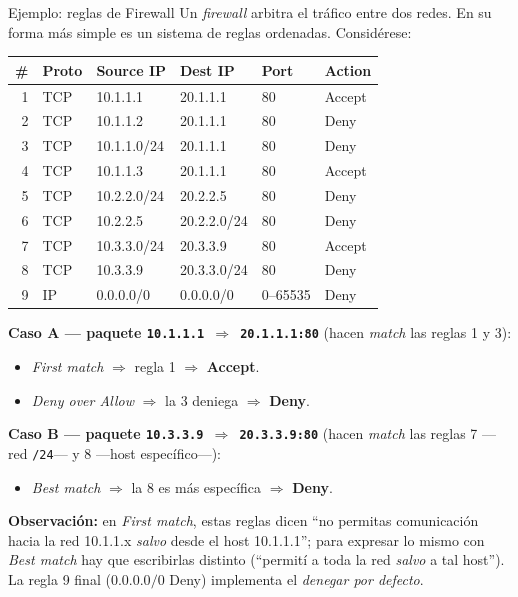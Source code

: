 \documentclass[11pt,a4paper]{article}
\begin{document}
\begin{practbox}{Ejemplo: reglas de Firewall}
Un \emph{firewall} arbitra el tráfico entre dos redes. En su forma más simple es un sistema
de reglas ordenadas. Considérese:
\begin{center}
\ttfamily\footnotesize
\renewcommand{\arraystretch}{1.1}
\begin{tabular}{r l l l l l}
\toprule
\# & Proto & Source IP & Dest IP & Port & Action\\
\midrule
1 & TCP & 10.1.1.1 & 20.1.1.1 & 80 & Accept\\
2 & TCP & 10.1.1.2 & 20.1.1.1 & 80 & Deny\\
3 & TCP & 10.1.1.0/24 & 20.1.1.1 & 80 & Deny\\
4 & TCP & 10.1.1.3 & 20.1.1.1 & 80 & Accept\\
5 & TCP & 10.2.2.0/24 & 20.2.2.5 & 80 & Deny\\
6 & TCP & 10.2.2.5 & 20.2.2.0/24 & 80 & Deny\\
7 & TCP & 10.3.3.0/24 & 20.3.3.9 & 80 & Accept\\
8 & TCP & 10.3.3.9 & 20.3.3.0/24 & 80 & Deny\\
9 & IP  & 0.0.0.0/0 & 0.0.0.0/0 & 0--65535 & Deny\\
\bottomrule
\end{tabular}
\end{center}
\medskip
\textbf{Caso A — paquete \texttt{10.1.1.1 $\Rightarrow$ 20.1.1.1:80}} (hacen \emph{match} las
reglas 1 y 3):
\begin{itemize}[leftmargin=1.4em,itemsep=1pt]
  \item \emph{First match} $\Rightarrow$ regla 1 $\Rightarrow$ \textbf{Accept}.
  \item \emph{Deny over Allow} $\Rightarrow$ la 3 deniega $\Rightarrow$ \textbf{Deny}.
\end{itemize}
\textbf{Caso B — paquete \texttt{10.3.3.9 $\Rightarrow$ 20.3.3.9:80}} (hacen \emph{match} las
reglas 7 —red \texttt{/24}— y 8 —host específico—):
\begin{itemize}[leftmargin=1.4em,itemsep=1pt]
  \item \emph{Best match} $\Rightarrow$ la 8 es más específica $\Rightarrow$ \textbf{Deny}.
\end{itemize}
\textbf{Observación:} en \emph{First match}, estas reglas dicen ``no permitas comunicación
hacia la red 10.1.1.x \emph{salvo} desde el host 10.1.1.1''; para expresar lo mismo con
\emph{Best match} hay que escribirlas distinto (``permití a toda la red \emph{salvo} a tal
host''). La regla 9 final ($0.0.0.0/0$ Deny) implementa el \emph{denegar por defecto}.
\end{practbox}
\end{document}
